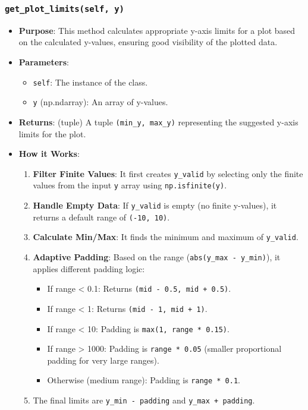 \documentclass[12pt,a4paper]{report}
\begin{document}
\subsubsection{\texttt{get\_plot\_limits(self, y)}}
\begin{itemize}
    \item \textbf{Purpose}: This method calculates appropriate y-axis limits for a plot based on the calculated y-values, ensuring good visibility of the plotted data.
    \item \textbf{Parameters}:
        \begin{itemize}
            \item \texttt{self}: The instance of the class.
            \item \texttt{y} (np.ndarray): An array of y-values.
        \end{itemize}
    \item \textbf{Returns}: (tuple) A tuple \texttt{(min\_y, max\_y)} representing the suggested y-axis limits for the plot.
    \item \textbf{How it Works}:
        \begin{enumerate}
            \item \textbf{Filter Finite Values}: It first creates \texttt{y\_valid} by selecting only the finite values from the input \texttt{y} array using \texttt{np.isfinite(y)}.
            \item \textbf{Handle Empty Data}: If \texttt{y\_valid} is empty (no finite y-values), it returns a default range of \texttt{(-10, 10)}.
            \item \textbf{Calculate Min/Max}: It finds the minimum and maximum of \texttt{y\_valid}.
            \item \textbf{Adaptive Padding}: Based on the range (\texttt{abs(y\_max - y\_min)}), it applies different padding logic:
                \begin{itemize}
                    \item If range < 0.1: Returns \texttt{(mid - 0.5, mid + 0.5)}.
                    \item If range < 1: Returns \texttt{(mid - 1, mid + 1)}.
                    \item If range < 10: Padding is \texttt{max(1, range * 0.15)}.
                    \item If range > 1000: Padding is \texttt{range * 0.05} (smaller proportional padding for very large ranges).
                    \item Otherwise (medium range): Padding is \texttt{range * 0.1}.
                \end{itemize}
            \item The final limits are \texttt{y\_min - padding} and \texttt{y\_max + padding}.
        \end{enumerate}
\end{itemize}
\end{document}

